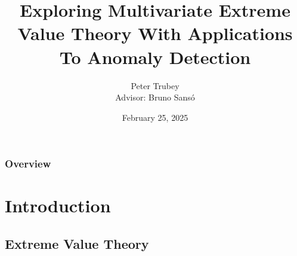 \documentclass[aspectratio=169,10pt,notes]{beamer}
\title{Exploring Multivariate Extreme Value Theory With 
    Applications To Anomaly Detection}
\author{Peter Trubey \\ Advisor: Bruno Sans{\'o}}
\institute{Department of Statistics - UCSC}
\date[2/??/2025]{February 25, 2025}
\begin{document}
\begin{frame}[plain]
  \titlepage
\end{frame}

\begin{frame}[plain]
  \frametitle{Overview}
  \tableofcontents
\end{frame}

\section{Introduction}



\subsection{Extreme Value Theory}
\end{document}
